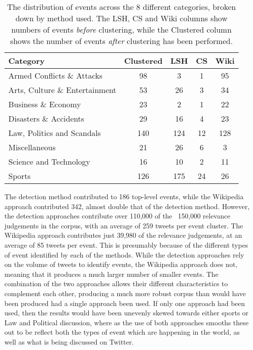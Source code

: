 \begin{table}[h!]
	\centering

	\caption{The distribution of events across the 8 different categories, broken down by method used. The LSH, CS and Wiki columns show numbers of events \emph{before} clustering, while the Clustered column shows the number of events \emph{after} clustering has been performed. }
	\label{table:eventsByCat}

	\begin{tabulary}{\textwidth}{l c c c c}
	\toprule
	\textbf{Category} & \textbf{Clustered} & \textbf{LSH} & \textbf{CS} & \textbf{Wiki}  \\
	\midrule

	Armed Conflicts \& Attacks 			& 98 	& 3 	& 1 	& 95 \\
	Arts, Culture \& Entertainment 		& 53 	& 26 	& 3 	& 34 \\
	Business \& Economy 				& 23 	& 2 	& 1 	& 22 \\
	Disasters \& Accidents 				& 29 	& 16 	& 4 	& 23 \\
	Law, Politics and Scandals 			& 140 	& 124 	& 12 	& 128 \\
	Miscellaneous 						& 21	& 26 	& 6 	& 3 \\
	Science and Technology 				& 16 	& 10 	& 2 	& 11 \\
	Sports 								& 126 	& 175 	& 24 	& 26 \\

	\bottomrule
	\end{tabulary}

\end{table}

The detection method contributed to 186 top-level events, while the Wikipedia approach contributed 342, almost double that of the detection method.
However, the detection approaches contribute over 110,000 of the ~150,000 relevance judgements in the corpus, with an average of 259 tweets per event cluster.
The Wikipedia approach contributes just 39,980 of the relevance judgements, at an average of 85 tweets per event.
This is presumably because of the different types of event identified by each of the methods.
While the detection approaches rely on the volume of tweets to identify events, the Wikipedia approach does not, meaning that it produces a much larger number of smaller events.
The combination of the two approaches allows their different characteristics to complement each other, producing a much more robust corpus than would have been produced had a single approach been used.
If only one approach had been used, then the results would have been unevenly skewed towards either sports or Law and Political discussion, where as the use of both approaches smooths these out to be reflect both the types of event which are happening in the world, as well as what is being discussed on Twitter.
